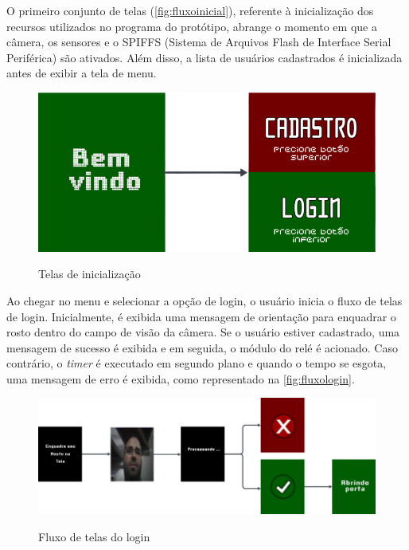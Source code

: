 O primeiro conjunto de telas (\autoref{fig:fluxoinicial}), referente à 
inicialização dos recursos utilizados no programa do protótipo, 
abrange o momento em que a câmera, os sensores e o SPIFFS 
(Sistema de Arquivos Flash de Interface Serial Periférica) 
são ativados. Além disso, a lista de usuários cadastrados é 
inicializada antes de exibir a tela de menu.

\begin{figure}[h!]
    \centering
    \caption{Telas de inicialização}
    \includegraphics[scale=0.25]{figuras/fluxo_inicial.png}
    \fonte{}%
    \label{fig:fluxoinicial}
    \centering
\end{figure}

Ao chegar no menu e selecionar a opção de login, o usuário inicia o 
fluxo de telas de login. Inicialmente, é exibida uma mensagem de 
orientação para enquadrar o rosto dentro do campo de visão da câmera. 
Se o usuário estiver cadastrado, uma mensagem de sucesso é exibida 
e em seguida, o módulo do relé é acionado. Caso contrário, o \textit{timer} 
é executado em segundo plano e quando o tempo se esgota, uma mensagem 
de erro é exibida, como representado na \autoref{fig:fluxologin}.

\begin{figure}[h!]
    \centering
    \caption{Fluxo de telas do login}
    \includegraphics[scale=2.1]{figuras/fluxo_login.png}
    \fonte{}%
    \label{fig:fluxologin}
    \centering
\end{figure}

